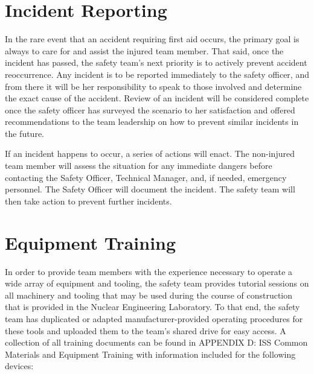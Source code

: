 \section{Incident Reporting}

In the rare event that an accident requiring first aid occurs, the primary goal is always to care for and assist the injured team member. That said, once the incident has passed, the safety team's next priority is to actively prevent accident reoccurrence. Any incident is to be reported immediately to the safety officer, and from there it will be her responsibility to speak to those involved and determine the exact cause of the accident. Review of an incident will be considered complete once the safety officer has surveyed the scenario to her satisfaction and offered recommendations to the team leadership on how to prevent similar incidents in the future.

If an incident happens to occur, a series of actions will enact. The non-injured team member will assess the situation for any immediate dangers before contacting the Safety Officer, Technical Manager, and, if needed, emergency personnel. The Safety Officer will document the incident. The safety team will then take action to prevent further incidents.

\section{Equipment Training}

In order to provide team members with the experience necessary to operate a wide array of equipment and tooling, the safety team provides tutorial sessions on all machinery and tooling that may be used during the course of construction that is provided in the Nuclear Engineering Laboratory. To that end, the safety team has duplicated or adapted manufacturer-provided operating procedures for these tools and uploaded them to the team's shared drive for easy access. A collection of all training documents can be found in APPENDIX D: ISS Common Materials and Equipment Training with information included for the following devices:

